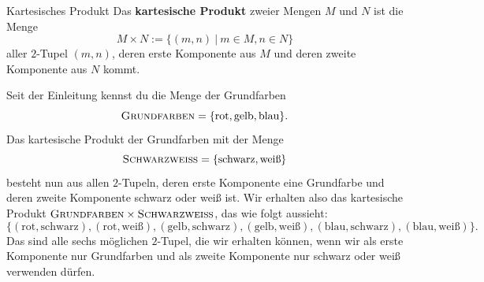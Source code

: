 \documentclass[../../main.tex]{subfiles}
\begin{document}
\begin{definition}{Kartesisches Produkt}
    Das \textbf{kartesische Produkt} zweier Mengen $M$ und $N$ ist die Menge
    \[M\times N:=\{(m,n)~|~m\in M, n\in N\}\]
    aller $2$-Tupel $(m,n)$, deren erste Komponente aus $M$ und deren zweite Komponente aus $N$ kommt.
\end{definition}

\begin{example}{}
    Seit der Einleitung kennst du die Menge der Grundfarben
    \[\textsc{Grundfarben}=\{\text{rot},\text{gelb},\text{blau}\}.\]
    Das kartesische Produkt der Grundfarben mit der Menge
    \[\textsc{Schwarzweiß}=\{\text{schwarz},\text{weiß}\}\] besteht nun aus allen $2$-Tupeln, deren erste Komponente eine Grundfarbe und deren zweite Komponente schwarz oder weiß ist. Wir erhalten also das kartesische Produkt $\textsc{Grundfarben}\times\textsc{Schwarzweiß}$, das wie folgt aussieht:
    \[\{(\text{rot},\text{schwarz}),(\text{rot},\text{weiß}),(\text{gelb},\text{schwarz}),(\text{gelb},\text{weiß}),(\text{blau},\text{schwarz}),(\text{blau},\text{weiß})\}.\]
    Das sind alle sechs möglichen $2$-Tupel, die wir erhalten können, wenn wir als erste Komponente nur Grundfarben und als zweite Komponente nur schwarz oder weiß verwenden dürfen.
\end{example}
\end{document}
